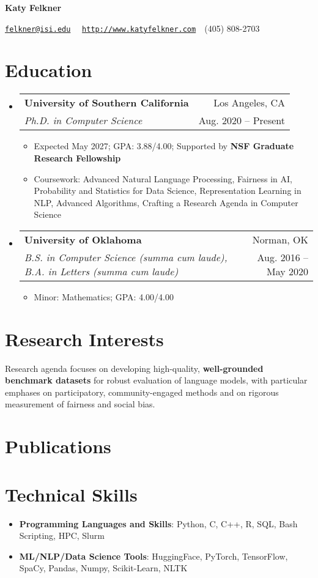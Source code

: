 \documentclass[letterpaper,11pt]{article}
\makeatletter
\newcommand{\resumeItemWithHeader}[2]{
  \item\small{
    \textbf{#1}{: #2 \vspace{-2pt}}
  }
}
\newcommand{\resumeItem}[1]{
  \item\small{
  {#1 \vspace{-2pt}}
  }
}
\newcommand{\resumeSubheading}[4]{
  \vspace{-1pt} \item
    \begin{tabular*}{0.97\textwidth}{l@{\extracolsep{\fill}}r}
      \textbf{#1} & #2 \\
      \textit{\small#3} & \small #4 \\
      
    \end{tabular*}\vspace{-5pt}
}
\newcommand{\resumeSubHeadingListStart}{\begin{itemize}[label={}, leftmargin=*]}
\newcommand{\resumeSubHeadingListEnd}{\end{itemize}}
\newcommand{\resumeItemListStart}{\begin{itemize}}
\newcommand{\resumeItemListEnd}{\end{itemize}\vspace{-5pt}}
\makeatother
\begin{document}
\textbf{\LARGE Katy Felkner}

\href{mailto:felkner@isi.edu}{\texttt{felkner@isi.edu}}~\textbar~ \href{http://katyfelkner.com/}{\texttt{http://www.katyfelkner.com}}~\textbar~(405) 808-2703


\section{Education}
  \resumeSubHeadingListStart
    \resumeSubheading
      {University of Southern California}{Los Angeles, CA}
      {Ph.D. in Computer Science}{Aug. 2020 -- Present}
      \resumeItemListStart
        \resumeItem{Expected May 2027; GPA: 3.88/4.00; Supported by \textbf{NSF Graduate Research Fellowship}}
      \resumeItem{Coursework: Advanced Natural Language Processing, Fairness in AI, Probability and Statistics for Data Science, Representation Learning in NLP, Advanced Algorithms, Crafting a Research Agenda in Computer Science}
      \resumeItemListEnd
      
    \resumeSubheading
      {University of Oklahoma}{Norman, OK}
      {B.S. in Computer Science \textit{(summa cum laude)}, B.A. in Letters \textit{(summa cum laude)}}{Aug. 2016 -- May 2020}
      \resumeItemListStart
        \resumeItem{Minor: Mathematics; GPA: 4.00/4.00} 
      \resumeItemListEnd
  \resumeSubHeadingListEnd

\section{Research Interests}
\small{Research agenda focuses on developing high-quality, \textbf{well-grounded benchmark datasets} for robust evaluation of language models, with particular emphases on participatory, community-engaged methods and on rigorous measurement of fairness and social bias.}

\section{Publications}
\begin{refsection}
\nocite{*}
\printbibliography[heading=none]
\end{refsection}

\section{Technical Skills}
 \resumeSubHeadingListStart
   \resumeItemWithHeader{Programming Languages and Skills}{Python, C, C++, R, SQL, Bash Scripting, HPC, Slurm}
   \resumeItemWithHeader{ML/NLP/Data Science Tools}{HuggingFace, PyTorch, TensorFlow, SpaCy, Pandas, Numpy, Scikit-Learn, NLTK}
 \resumeSubHeadingListEnd
\end{document}
